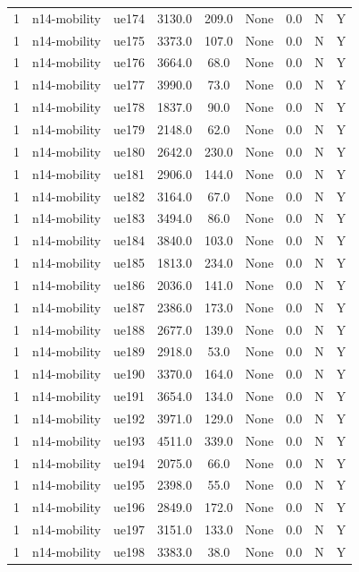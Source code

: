 \begin{table}[ht]
\begin{tabular}{|c|c|c|c|c|c|c|c|c|}
1 & n14-mobility & ue174 & 3130.0 & 209.0 & None & 0.0 & N & Y \\
1 & n14-mobility & ue175 & 3373.0 & 107.0 & None & 0.0 & N & Y \\
1 & n14-mobility & ue176 & 3664.0 & 68.0 & None & 0.0 & N & Y \\
1 & n14-mobility & ue177 & 3990.0 & 73.0 & None & 0.0 & N & Y \\
1 & n14-mobility & ue178 & 1837.0 & 90.0 & None & 0.0 & N & Y \\
1 & n14-mobility & ue179 & 2148.0 & 62.0 & None & 0.0 & N & Y \\
1 & n14-mobility & ue180 & 2642.0 & 230.0 & None & 0.0 & N & Y \\
1 & n14-mobility & ue181 & 2906.0 & 144.0 & None & 0.0 & N & Y \\
1 & n14-mobility & ue182 & 3164.0 & 67.0 & None & 0.0 & N & Y \\
1 & n14-mobility & ue183 & 3494.0 & 86.0 & None & 0.0 & N & Y \\
1 & n14-mobility & ue184 & 3840.0 & 103.0 & None & 0.0 & N & Y \\
1 & n14-mobility & ue185 & 1813.0 & 234.0 & None & 0.0 & N & Y \\
1 & n14-mobility & ue186 & 2036.0 & 141.0 & None & 0.0 & N & Y \\
1 & n14-mobility & ue187 & 2386.0 & 173.0 & None & 0.0 & N & Y \\
1 & n14-mobility & ue188 & 2677.0 & 139.0 & None & 0.0 & N & Y \\
1 & n14-mobility & ue189 & 2918.0 & 53.0 & None & 0.0 & N & Y \\
1 & n14-mobility & ue190 & 3370.0 & 164.0 & None & 0.0 & N & Y \\
1 & n14-mobility & ue191 & 3654.0 & 134.0 & None & 0.0 & N & Y \\
1 & n14-mobility & ue192 & 3971.0 & 129.0 & None & 0.0 & N & Y \\
1 & n14-mobility & ue193 & 4511.0 & 339.0 & None & 0.0 & N & Y \\
1 & n14-mobility & ue194 & 2075.0 & 66.0 & None & 0.0 & N & Y \\
1 & n14-mobility & ue195 & 2398.0 & 55.0 & None & 0.0 & N & Y \\
1 & n14-mobility & ue196 & 2849.0 & 172.0 & None & 0.0 & N & Y \\
1 & n14-mobility & ue197 & 3151.0 & 133.0 & None & 0.0 & N & Y \\
1 & n14-mobility & ue198 & 3383.0 & 38.0 & None & 0.0 & N & Y \\

\end{tabular}
\end{table}
